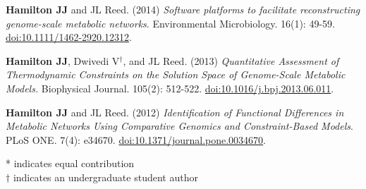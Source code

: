 \documentclass[letterpaper,10pt]{article}
\begin{document}
\begin{etaremune}[itemsep=-2pt]
	\item \textbf{Hamilton JJ} and JL Reed. (2014) \emph{Software platforms to facilitate reconstructing genome-scale metabolic networks}. Environmental Microbiology. 16(1): 49-59. \href{http://onlinelibrary.wiley.com/doi/10.1111/1462-2920.12312/abstract}{doi:10.1111/1462-2920.12312}.
	\item \textbf{Hamilton JJ}, Dwivedi V$^\dagger$, and JL Reed. (2013) \emph{Quantitative Assessment of Thermodynamic Constraints on the Solution Space of Genome-Scale Metabolic Models.} Biophysical Journal. 105(2): 512-522. \href{http://www.cell.com/biophysj/abstract/S0006-3495%2813%2900685-1}{doi:10.1016/j.bpj.2013.06.011}.
	\item \textbf{Hamilton JJ} and JL Reed. (2012) \emph{Identification of Functional Differences in Metabolic Networks Using Comparative Genomics and Constraint-Based Models}. PLoS ONE. 7(4): e34670. \href{http://journals.plos.org/plosone/article?id=10.1371/journal.pone.0034670}{doi:10.1371/journal.pone.0034670}.
\end{etaremune}
* indicates equal contribution \\
$\dagger$ indicates an undergraduate student author
\end{document}
